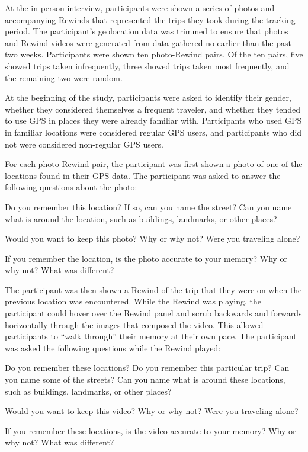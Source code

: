 \documentclass{sigchi}
\begin{document}
At the in-person interview, participants were shown a series of photos and accompanying Rewinds that represented the trips they took during the tracking period. The participant's geolocation data was trimmed to ensure that photos and Rewind videos were generated from data gathered no earlier than the past two weeks. Participants were shown ten photo-Rewind pairs.  Of the ten pairs, five showed trips taken infrequently, three showed trips taken most frequently, and the remaining two were random. 

At the beginning of the study, participants were asked to identify their gender, whether they considered themselves a frequent traveler, and whether they tended to use GPS in places they were already familiar with. Participants who used GPS in familiar locations were considered regular GPS users, and participants who did not were considered non-regular GPS users.

For each photo-Rewind pair, the participant was first shown a photo of one of the locations found in their GPS data. The participant was asked to answer the following questions about the photo:

Do you remember this location? If so, can you name the street? Can you name what is around the location, such as buildings, landmarks, or other places?

Would you want to keep this photo? Why or why not? Were you traveling alone?

If you remember the location, is the photo accurate to your memory? Why or why not? What was different?

The participant was then shown a Rewind of the trip that they were on when the previous location was encountered. While the Rewind was playing, the participant could hover over the Rewind panel and scrub backwards and forwards horizontally through the images that composed the video. This allowed participants to ``walk through'' their memory at their own pace. The participant was asked the following questions while the Rewind played:

Do you remember these locations? Do you remember this particular trip? Can  you name some of the streets? Can you name what is around these locations, such as buildings, landmarks, or other places?

Would you want to keep this video? Why or why not? Were you traveling alone?

If you remember these locations, is the video accurate to your memory? Why or why not? What was different?
\end{document}
